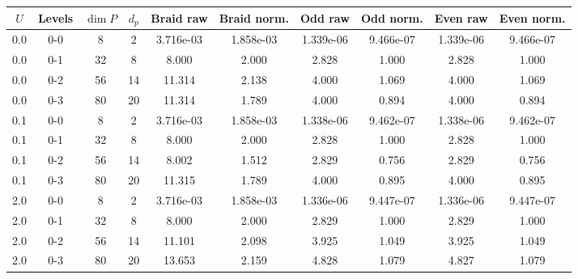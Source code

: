 \begin{tabular}{cccccccccc}
\hline
$U$ & Levels & $\dim P$ & $d_p$ & Braid raw & Braid norm. & Odd raw & Odd norm. & Even raw & Even norm. \\
\hline
0.0 & 0-0 & 8 & 2 & 3.716e-03 & 1.858e-03 & 1.339e-06 & 9.466e-07 & 1.339e-06 & 9.466e-07 \\
0.0 & 0-1 & 32 & 8 & 8.000 & 2.000 & 2.828 & 1.000 & 2.828 & 1.000 \\
0.0 & 0-2 & 56 & 14 & 11.314 & 2.138 & 4.000 & 1.069 & 4.000 & 1.069 \\
0.0 & 0-3 & 80 & 20 & 11.314 & 1.789 & 4.000 & 0.894 & 4.000 & 0.894 \\
0.1 & 0-0 & 8 & 2 & 3.716e-03 & 1.858e-03 & 1.338e-06 & 9.462e-07 & 1.338e-06 & 9.462e-07 \\
0.1 & 0-1 & 32 & 8 & 8.000 & 2.000 & 2.828 & 1.000 & 2.828 & 1.000 \\
0.1 & 0-2 & 56 & 14 & 8.002 & 1.512 & 2.829 & 0.756 & 2.829 & 0.756 \\
0.1 & 0-3 & 80 & 20 & 11.315 & 1.789 & 4.000 & 0.895 & 4.000 & 0.895 \\
2.0 & 0-0 & 8 & 2 & 3.716e-03 & 1.858e-03 & 1.336e-06 & 9.447e-07 & 1.336e-06 & 9.447e-07 \\
2.0 & 0-1 & 32 & 8 & 8.000 & 2.000 & 2.829 & 1.000 & 2.829 & 1.000 \\
2.0 & 0-2 & 56 & 14 & 11.101 & 2.098 & 3.925 & 1.049 & 3.925 & 1.049 \\
2.0 & 0-3 & 80 & 20 & 13.653 & 2.159 & 4.828 & 1.079 & 4.827 & 1.079 \\
\hline
\end{tabular}
